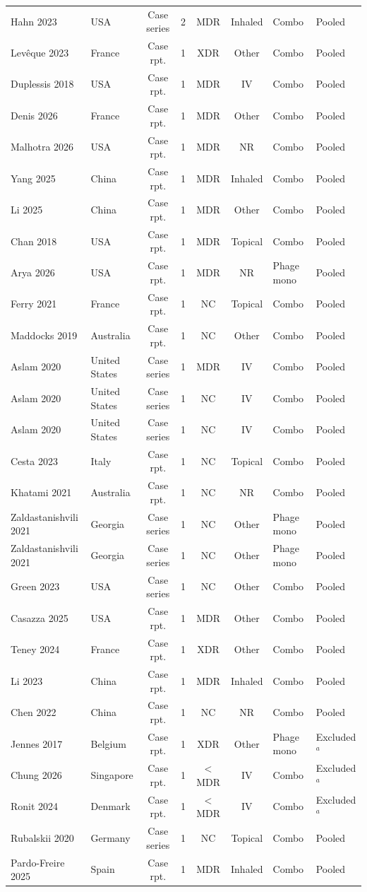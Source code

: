 \begin{tabular}{llccccll}
Hahn 2023 & USA & Case series & 2 & MDR & Inhaled & Combo & Pooled \\
Lev\^eque 2023 & France & Case rpt. & 1 & XDR & Other & Combo & Pooled \\
Duplessis 2018 & USA & Case rpt. & 1 & MDR & IV & Combo & Pooled \\
Denis 2026 & France & Case rpt. & 1 & MDR & Other & Combo & Pooled \\
Malhotra 2026 & USA & Case rpt. & 1 & MDR & NR & Combo & Pooled \\
Yang 2025 & China & Case rpt. & 1 & MDR & Inhaled & Combo & Pooled \\
Li 2025 & China & Case rpt. & 1 & MDR & Other & Combo & Pooled \\
Chan 2018 & USA & Case rpt. & 1 & MDR & Topical & Combo & Pooled \\
Arya 2026 & USA & Case rpt. & 1 & MDR & NR & Phage mono & Pooled \\
Ferry 2021 & France & Case rpt. & 1 & NC & Topical & Combo & Pooled \\
Maddocks 2019 & Australia & Case rpt. & 1 & NC & Other & Combo & Pooled \\
Aslam 2020 & United States & Case series & 1 & MDR & IV & Combo & Pooled \\
Aslam 2020 & United States & Case series & 1 & NC & IV & Combo & Pooled \\
Aslam 2020 & United States & Case series & 1 & NC & IV & Combo & Pooled \\
Cesta 2023 & Italy & Case rpt. & 1 & NC & Topical & Combo & Pooled \\
Khatami 2021 & Australia & Case rpt. & 1 & NC & NR & Combo & Pooled \\
Zaldastanishvili 2021 & Georgia & Case series & 1 & NC & Other & Phage mono & Pooled \\
Zaldastanishvili 2021 & Georgia & Case series & 1 & NC & Other & Phage mono & Pooled \\
Green 2023 & USA & Case series & 1 & NC & Other & Combo & Pooled \\
Casazza 2025 & USA & Case rpt. & 1 & MDR & Other & Combo & Pooled \\
Teney 2024 & France & Case rpt. & 1 & XDR & Other & Combo & Pooled \\
Li 2023 & China & Case rpt. & 1 & MDR & Inhaled & Combo & Pooled \\
Chen 2022 & China & Case rpt. & 1 & NC & NR & Combo & Pooled \\
Jennes 2017 & Belgium & Case rpt. & 1 & XDR & Other & Phage mono & Excluded$^{a}$ \\
Chung 2026 & Singapore & Case rpt. & 1 & $<$MDR & IV & Combo & Excluded$^{a}$ \\
Ronit 2024 & Denmark & Case rpt. & 1 & $<$MDR & IV & Combo & Excluded$^{a}$ \\
Rubalskii 2020 & Germany & Case series & 1 & NC & Topical & Combo & Pooled \\
Pardo-Freire 2025 & Spain & Case rpt. & 1 & MDR & Inhaled & Combo & Pooled \\
\bottomrule
\end{tabular}
